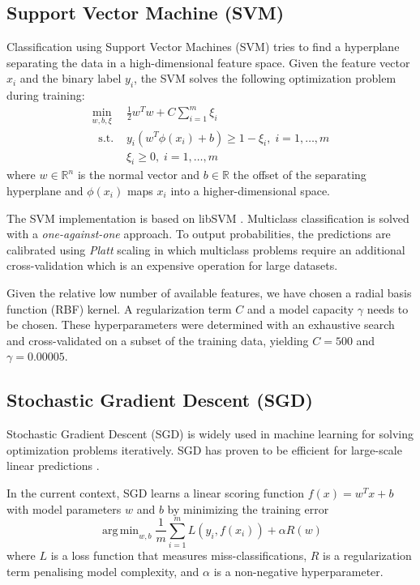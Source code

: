 \documentclass[journal]{IEEEtran}
\DeclareMathOperator*{\argmin}{arg\,min}
\begin{document}
\subsection{Support Vector Machine (SVM)}
Classification using Support Vector Machines (SVM) tries to find a hyperplane separating the data in a high-dimensional feature space. Given the feature vector $x_i$ and the binary label $y_i$, the SVM solves the following optimization problem during training:
\begin{equation}
\begin{split}
\min_{w, b, \xi} \ & \frac{1}{2}w^Tw + C\sum_{i=1}^m \xi_i \\
\ \text{ s.t. } & y_i(w^T\phi(x_i)+b) \geq 1-\xi_i, \; i = 1, \ldots, m \\
& \xi_i \geq 0, \; i = 1, \ldots, m
\end{split}
\end{equation}
where $w\in \mathbb{R}^n $ is the normal vector and $b \in \mathbb{R}$ the offset of the separating hyperplane and $\phi(x_i)$ maps $x_i$ into a higher-dimensional space.

The SVM implementation is based on libSVM \cite{chang2011libsvm}. Multiclass classification is solved with a \textit{one-against-one} approach. To output probabilities, the predictions are calibrated using \textit{Platt} scaling in which multiclass problems require an additional cross-validation which is an expensive operation for large datasets.

Given the relative low number of available features, we have chosen a radial basis function (RBF) kernel. A regularization term $C$ and a model capacity $\gamma$ needs to be chosen. These hyperparameters were determined with an exhaustive search and cross-validated on a subset of the training data, yielding $C=500$ and $\gamma=0.00005$.

\subsection{Stochastic Gradient Descent (SGD)}
Stochastic Gradient Descent (SGD) is widely used in machine learning for solving optimization problems iteratively. SGD has proven to be efficient for large-scale linear predictions \cite{zhang2004solving}.

In the current context, SGD learns a linear scoring function $f(x) = w^Tx + b$ with model parameters $w$ and $b$ by minimizing the training error
\begin{equation}
\argmin_{w,b} \frac{1}{m}\sum_{i=1}^mL(y_i, f(x_i)) + \alpha R(w)
\end{equation}
where $L$ is a loss function that measures miss-classifications, $R$ is a regularization term penalising model complexity, and $\alpha$ is a non-negative hyperparameter.
\end{document}
